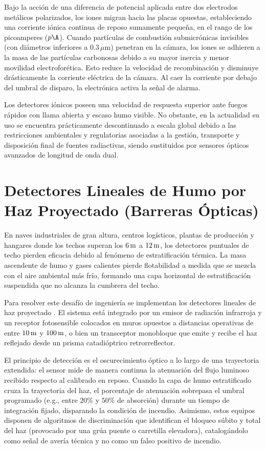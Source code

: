 Bajo la acción de una diferencia de potencial aplicada entre dos electrodos metálicos polarizados, los iones migran hacia
las placas opuestas, estableciendo una corriente iónica continua de reposo sumamente pequeña, en el rango de los
picoamperes ($p\A$). Cuando partículas de combustión submicrónicas invisibles (con diámetros inferiores a
$0.3\,\mu\mathrm{m}$) penetran en la cámara, los iones se adhieren a la masa de las partículas carbonosas debido a su mayor
inercia y menor movilidad electroforética. Esto reduce la velocidad de recombinación y disminuye drásticamente la
corriente eléctrica de la cámara. Al caer la corriente por debajo del umbral de disparo, la electrónica activa la
señal de alarma.

Los detectores iónicos poseen una velocidad de respuesta superior ante fuegos rápidos con llama abierta y escaso humo
visible. No obstante, en la actualidad su uso se encuentra prácticamente descontinuado a escala global debido a las
restricciones ambientales y regulatorias asociadas a la gestión, transporte y disposición final de fuentes radiactivas,
siendo sustituidos por sensores ópticos avanzados de longitud de onda dual.

\section{Detectores Lineales de Humo por Haz Proyectado (Barreras Ópticas)}

En naves industriales de gran altura, centros logísticos, plantas de producción y hangares donde los techos superan los
$6\,\mathrm{m}$ a $12\,\mathrm{m}$, los detectores puntuales de techo pierden eficacia debido al fenómeno de estratificación térmica. La masa
ascendente de humo y gases calientes pierde flotabilidad a medida que se mezcla con el aire ambiental más frío,
formando una capa horizontal de estratificación suspendida que no alcanza la cumbrera del techo.

Para resolver este desafío de ingeniería se implementan los detectores lineales de haz proyectado . El sistema está
integrado por un emisor de radiación infrarroja y un receptor fotosensible colocados en muros opuestos a distancias
operativas de entre $10\,\mathrm{m}$ y $100\,\mathrm{m}$, o bien un transceptor monobloque que emite y recibe el haz reflejado desde un
prisma catadióptrico retrorreflector.

El principio de detección es el oscurecimiento óptico a lo largo de una trayectoria extendida: el sensor mide de manera
continua la atenuación del flujo luminoso recibido respecto al calibrado en reposo. Cuando la capa de humo estratificado
cruza la trayectoria del haz, el porcentaje de atenuación sobrepasa el umbral programado (e.g., entre $20\percent$ y
$50\percent$ de absorción) durante un tiempo de integración fijado, disparando la condición de incendio. Asimismo, estos
equipos disponen de algoritmos de discriminación que identifican el bloqueo súbito y total del haz (provocado por una grúa
puente o carretilla elevadora), catalogándolo como señal de avería técnica y no como un falso positivo de incendio.

